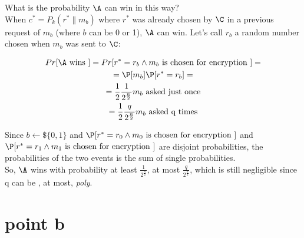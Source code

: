 What is the probability $\A$ can win in this way?\\
When $c^{*}=P_{k}(r^{*}\|m_{b})$ where $r^{*}$ was already chosen by $\C$
in a previous request of $m_{b}$ (where $b$ can be 0 or 1), $\A$ can win.
Let's call $r_{b}$ a random number chosen when $m_{b}$ was sent to $\C$:

\begin{gather*}
Pr[\A \text{ wins } ] = Pr[r^{*}= r_{b} \wedge m_{b} \text{ is chosen for encryption } ]=\\
= \P [ m_{b} ] \P [ r^{*}=r_{b} ]=\\
=\frac{1}{2} \frac{1}{2^{\frac{n}{2}}} m_{b} \text{ asked just once}\\
=\frac{1}{2} \frac{q}{2^{\frac{n}{2}}} m_{b} \text{ asked q times}
\end{gather*}

Since $b \leftarrow\$ \{0,1\}$ and $\P [r^{*}= r_{0} \wedge m_{0} \text{ is chosen for encryption } ]$ and $\P [r^{*}= r_{1} \wedge m_{1} \text{ is chosen for encryption } ]$ are disjoint probabilities, the probabilities of the two events is the sum of single probabilities.\\

So, $\A$ wins with probability at least $\frac{1}{2^{\frac{n}{2}}}$, at most $\frac{q}{2^{\frac{n}{2}}}$, which is still negligible since q can be , at most, \textit{poly}.\\ 


\section{point b}


